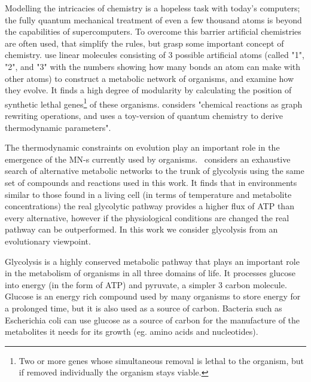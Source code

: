 \documentclass[a4paper,12pt]{article}
\begin{document}
	Modelling the intricacies of chemistry is a hopeless task with today's computers; the fully quantum mechanical treatment of even a few thousand atoms is beyond the capabilities of supercomputers. To overcome this barrier artificial chemistries are often used, that simplify the rules, but grasp some important concept of chemistry\cite{artificialreview}. \cite{evolutioncomplex} use linear molecules consisting of 3 possible artificial atoms (called "1", "2", and "3" with the numbers showing how many bonds an atom can make with other atoms) to construct a metabolic network of organisms, and examine how they evolve. It finds a high degree of modularity by calculating the position of synthetic lethal genes\footnote{Two or more genes whose simultaneous removal is lethal to the organism, but if removed individually the organism stays viable.} of these organisms. \cite{computationalframework} considers "chemical reactions as graph rewriting operations, and uses a toy-version of quantum chemistry to derive thermodynamic parameters". %
	
	The thermodynamic constraints on evolution play an important role in the emergence of the MN-s currently used by organisms. \cite{BartekLower}~considers an exhaustive search of alternative metabolic networks to the trunk of glycolysis using the same set of compounds and reactions used in this work. It finds that in environments similar to those found in a living cell (in terms of temperature and metabolite concentrations) the real glycolytic pathway provides a higher flux of ATP than every alternative, however if the physiological conditions are changed the real pathway can be outperformed. In this work we consider glycolysis from an evolutionary viewpoint. 


	

Glycolysis is a highly conserved metabolic pathway that plays an important role in the metabolism of organisms in all three domains of life. It processes glucose into energy (in the form of ATP) and pyruvate, a simpler 3 carbon molecule. Glucose is an energy rich compound used by many organisms to store energy for a prolonged time, but it is also used as a source of carbon. Bacteria such as Escherichia coli can use glucose as a source of carbon for the manufacture of the metabolites it needs for its growth (eg. amino acids and nucleotides)\cite[]{principlesofbio}.
\end{document}
